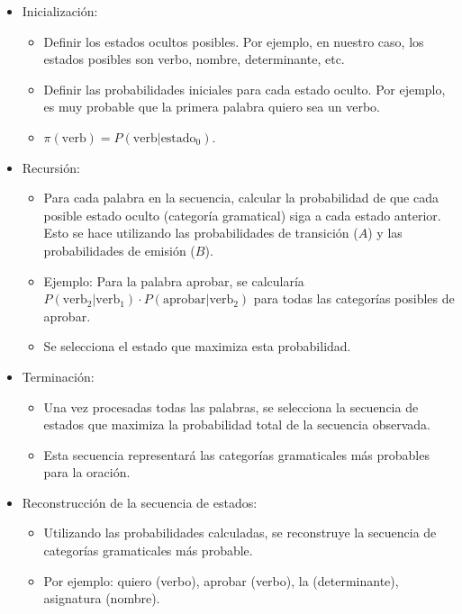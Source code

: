\documentclass[11pt,openany]{book}
\begin{document}
\begin{itemize}
      \item Inicialización:
      \begin{itemize}
            \item Definir los estados ocultos posibles. Por ejemplo, en nuestro caso, los estados posibles son verbo, nombre, determinante, etc.
            \item Definir las probabilidades iniciales para cada estado oculto. Por ejemplo, es muy probable que la primera palabra quiero sea un verbo.
            \item $\pi(\text{verb}) = P(\text{verb} | \text{estado}_0)$.
      \end{itemize}
      \item Recursión:
      \begin{itemize}
            \item Para cada palabra en la secuencia, calcular la probabilidad de que cada posible estado oculto (categoría gramatical) siga a cada estado anterior. Esto se hace utilizando las probabilidades de transición ($A$) y las probabilidades de emisión ($B$).
            \item Ejemplo: Para la palabra aprobar, se calcularía $P(\text{verb}_2 | \text{verb}_1) \cdot P(\text{aprobar} | \text{verb}_2)$ para todas las categorías posibles de aprobar.
            \item Se selecciona el estado que maximiza esta probabilidad.
      \end{itemize}
      \item Terminación:
      \begin{itemize}
            \item Una vez procesadas todas las palabras, se selecciona la secuencia de estados que maximiza la probabilidad total de la secuencia observada.
            \item Esta secuencia representará las categorías gramaticales más probables para la oración.
      \end{itemize}
      \item Reconstrucción de la secuencia de estados:
      \begin{itemize}
            \item Utilizando las probabilidades calculadas, se reconstruye la secuencia de categorías gramaticales más probable.
            \item Por ejemplo: quiero (verbo), aprobar (verbo), la (determinante), asignatura (nombre).
      \end{itemize}
\end{itemize}
\end{document}
